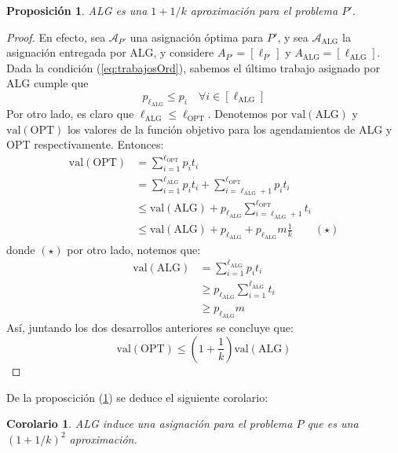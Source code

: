 \documentclass[10pt]{article}
\newcommand{\val}[1]{\text{val}(#1)}
\theoremstyle{plain}
\newtheorem{prop}{Proposición}
\newtheorem{cor}{Corolario}
\theoremstyle{definition}
\begin{document}
\begin{prop}
\label{prop:appP'}
ALG es una $1+1/k$ aproximación para el problema $P'$.
\end{prop}
\begin{proof}
En efecto, sea $\mathcal{A}_{P'}$ una asignación óptima para $P'$, y sea $\mathcal{A}_{\text{ALG}}$ la asignación entregada por ALG, y considere $A_{P'} = [\ell_{P'}]$ y $A_{\text{ALG}}= [\ell_{\text{ALG}}]$. Dada la condición (\ref{eq:trabajosOrd}), sabemos el último trabajo asignado por ALG cumple que
\begin{equation}
\label{eq:minorante}
p_{\ell_{\text{ALG}}} \leq p_i \quad \forall i \in [\ell_{\text{ALG}}]
\end{equation}
Por otro lado, es claro que $\ell_{\text{ALG}} \leq \ell_{\text{OPT}}$. Denotemos por $\val{\text{ALG}}$ y $\val{\text{OPT}}$ los valores de la función objetivo para los agendamientos de ALG y OPT respectivamente. Entonces:
\begin{align*}
\val{\text{OPT}} &= \sum_{i = 1}^{\ell_{\text{OPT}}} p_i t_i \\
		  &= \sum_{i=1}^{\ell_\text{ALG}}p_i t_i + \sum_{i = \ell_{\text{ALG}}+1}^{\ell_{\text{OPT}}}p_it_i\\
		  &\leq \val{\text{ALG}}+p_{\ell_\text{ALG}} \sum_{i = \ell_{\text{ALG}}+1}^{\ell_{\text{OPT}}}t_i \\
		  &\leq \val{\text{ALG}}+p_{\ell_\text{ALG}} + p_{\ell_\text{ALG}} m\frac{1}{k} \qquad (\star)
\end{align*}
donde $(\star)$ por otro lado, notemos que:
\begin{align*}
\val{\text{ALG}} &= \sum_{i=1}^{\ell_{\text{ALG}}} p_i t_i \\
		  &\geq p_{\ell_{\text{ALG}}}\sum_{i=1}^{\ell_{\text{ALG}}} t_i\\
		  &\geq p_{\ell_{\text{ALG}}}m
\end{align*}
Así, juntando los dos desarrollos anteriores se concluye que:
$$
\val{\text{OPT}} \leq \left(1 + \frac{1}{k}\right) \val{\text{ALG}}
$$
\end{proof}
De la proposcición (\ref{prop:appP'}) se deduce el siguiente corolario:
\begin{cor}
ALG induce una asignación para el problema $P$ que es una $(1+1/k)^2$ aproximación.
\end{cor}
\end{document}
